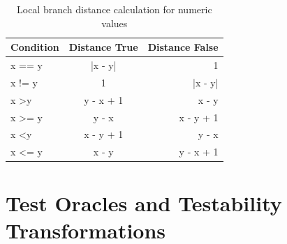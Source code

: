 \documentclass[paper=a4,%
  twoside,%
  BCOR4mm,%
  abstract=true,%
  toc=bibliography,%
  chapterprefix=true,%
  toc=bibliographynumbered,%
  open=right,%
  english,%
  pagesize=pdftex]{scrreprt}
\newcommand{\sut}{\ac{SUT}\xspace}
\begin{document}

\begin{table}[]
\centering
\begin{tabular}{lcr}
\hline
\textbf{Condition}  & \textbf{Distance True} & \textbf{Distance False} \\
\hline
x == y              & |x - y|                & 1                       \\
x != y              & 1                      & |x - y|                 \\
x \textgreater y    & y - x + 1              & x - y                   \\
x \textgreater{}= y & y - x                  & x - y + 1               \\
x \textless y       & x - y + 1              & y - x                   \\
x \textless{}= y    & x - y                  & y - x + 1               \\ \hline
\end{tabular}
\caption{Local branch distance calculation for numeric values}
\label{tab:local-branch-distance-formulas}
\end{table}

\section{Test Oracles and Testability Transformations}
\label{sec:testability-transformations}
\end{document}

